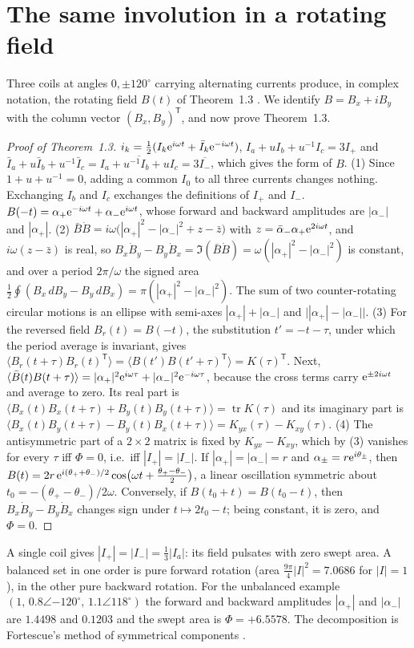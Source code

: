 \documentclass[11pt]{article}
\theoremstyle{definition}\newtheorem{definition}[theorem]{Definition}
\theoremstyle{remark}\newtheorem{remark}[theorem]{Remark}
\begin{document}
\section{The same involution in a rotating field}\label{sec:field}
Three coils at angles $0,\pm120^\circ$ carrying alternating currents produce, in complex notation, the rotating field $B(t)$ of Theorem~1.3 \cite{Ferraris,Tesla}. We identify $B=B_x+iB_y$ with the column vector $(B_x,B_y)^{\mathsf T}$, and now prove Theorem~1.3.
\begin{proof}[Proof of Theorem~1.3]
$i_k=\frac12(I_k\mathrm e^{i\omega t}+\bar I_k\mathrm e^{-i\omega t})$, $I_a+uI_b+u^{-1}I_c=3I_+$ and $\bar I_a+u\bar I_b+u^{-1}\bar I_c=\overline{I_a+u^{-1}I_b+uI_c}=3\overline{I_-}$, which gives the form of $B$. (1) Since $1+u+u^{-1}=0$, adding a common $I_0$ to all three currents changes nothing. Exchanging $I_b$ and $I_c$ exchanges the definitions of $I_+$ and $I_-$. $B(-t)=\alpha_+\mathrm e^{-i\omega t}+\alpha_-\mathrm e^{i\omega t}$, whose forward and backward amplitudes are $|\alpha_-|$ and $|\alpha_+|$. (2) $\bar B\dot B=i\omega\bigl(|\alpha_+|^2-|\alpha_-|^2+z-\bar z\bigr)$ with $z=\bar\alpha_-\alpha_+\mathrm e^{2i\omega t}$, and $i\omega(z-\bar z)$ is real, so $B_x\dot B_y-B_y\dot B_x=\Im(\bar B\dot B)=\omega(|\alpha_+|^2-|\alpha_-|^2)$ is constant, and over a period $2\pi/\omega$ the signed area $\frac12\oint(B_x\,dB_y-B_y\,dB_x)=\pi(|\alpha_+|^2-|\alpha_-|^2)$. The sum of two counter-rotating circular motions is an ellipse with semi-axes $|\alpha_+|+|\alpha_-|$ and $\bigl||\alpha_+|-|\alpha_-|\bigr|$. (3) For the reversed field $B_r(t)=B(-t)$, the substitution $t'=-t-\tau$, under which the period average is invariant, gives $\langle B_r(t+\tau)B_r(t)^{\mathsf T}\rangle=\langle B(t')B(t'+\tau)^{\mathsf T}\rangle=K(\tau)^{\mathsf T}$. Next, $\langle\bar B(t)B(t+\tau)\rangle=|\alpha_+|^2\mathrm e^{i\omega\tau}+|\alpha_-|^2\mathrm e^{-i\omega\tau}$, because the cross terms carry $\mathrm e^{\pm2i\omega t}$ and average to zero. Its real part is $\langle B_x(t)B_x(t+\tau)+B_y(t)B_y(t+\tau)\rangle=\operatorname{tr}K(\tau)$ and its imaginary part is $\langle B_x(t)B_y(t+\tau)-B_y(t)B_x(t+\tau)\rangle=K_{yx}(\tau)-K_{xy}(\tau)$. (4) The antisymmetric part of a $2\times2$ matrix is fixed by $K_{yx}-K_{xy}$, which by (3) vanishes for every $\tau$ iff $\Phi=0$, i.e.\ iff $|I_+|=|I_-|$. If $|\alpha_+|=|\alpha_-|=r$ and $\alpha_\pm=r\mathrm e^{i\theta_\pm}$, then $B(t)=2r\,\mathrm e^{i(\theta_++\theta_-)/2}\cos\bigl(\omega t+\frac{\theta_+-\theta_-}2\bigr)$, a linear oscillation symmetric about $t_0=-(\theta_+-\theta_-)/2\omega$. Conversely, if $B(t_0+t)=B(t_0-t)$, then $B_x\dot B_y-B_y\dot B_x$ changes sign under $t\mapsto2t_0-t$; being constant, it is zero, and $\Phi=0$.
\end{proof}
A single coil gives $|I_+|=|I_-|=\frac13|I_a|$: its field pulsates with zero swept area. A balanced set in one order is pure forward rotation (area $\frac{9\pi}4|I|^2=7.0686$ for $|I|=1$), in the other pure backward rotation. For the unbalanced example $(1,\,0.8\angle{-120^\circ},\,1.1\angle{118^\circ})$ the forward and backward amplitudes $|\alpha_+|$ and $|\alpha_-|$ are $1.4498$ and $0.1203$ and the swept area is $\Phi=+6.5578$. The decomposition is Fortescue's method of symmetrical components \cite{Fortescue,Clarke}.
\end{document}
